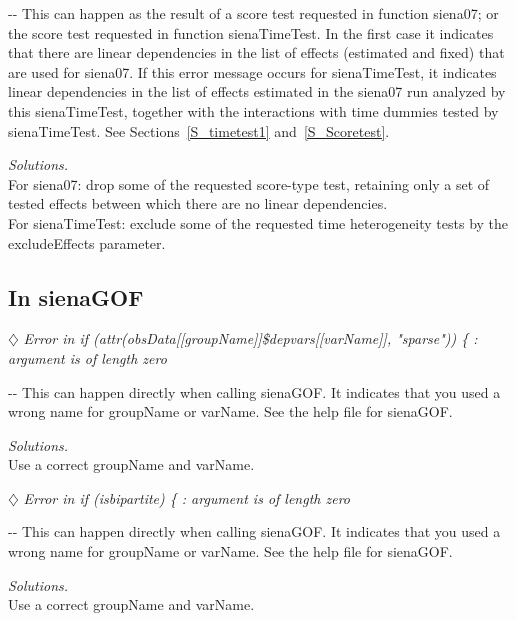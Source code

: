 \documentclass[a4paper,fleqn,11pt]{article}
\makeatletter
\newcommand{\+}{\, + \,}
\newcommand{\sfn}[1]{\textsf{#1}}
\newenvironment{indentation}[2]
{\par \setlength{\leftmargin}{#1}       \setlength{\rightmargin}{#2}
  \advance\linewidth -\leftmargin       \advance\linewidth -\rightmargin
  \advance\@totalleftmargin\leftmargin  \@setpar{{\@@par}}%
  \parshape 1 \@totalleftmargin         \linewidth \ignorespaces}{\par}
\makeatother
\begin{document}
\begin{indentation}{0.04\textwidth}{0pt}
\noindent
This can happen as the result of a score test requested in function
\sfn{siena07}; or the score test requested in function
\sfn{sienaTimeTest}.
In the first case it indicates that there are linear dependencies in the
list of effects (estimated and fixed)
that are used for \sfn{siena07}.
If this error message occurs for \sfn{sienaTimeTest}, it indicates
linear dependencies in the list of effects estimated
in the \sfn{siena07} run analyzed by this \sfn{sienaTimeTest},
together with the interactions with time dummies tested by
\sfn{sienaTimeTest}.
See Sections~\ref{S_timetest1} and~\ref{S_Scoretest}.
\smallskip

\noindent
\emph{Solutions.} \\
For \sfn{siena07}: drop some of the requested score-type test,
retaining only a set of tested effects between which there are no
linear dependencies.\\
For \sfn{sienaTimeTest}: exclude some of the requested
time heterogeneity tests by the \sfn{excludeEffects} parameter.
\end{indentation}

\subsection{In sienaGOF}

$\diamondsuit$
\emph{Error in if (attr(obsData[[groupName]]\$depvars[[varName]], "sparse")) \{ :\\
  argument is of length zero }
\smallskip

\begin{indentation}{0.04\textwidth}{0pt}
\noindent
This can happen directly when calling \sfn{sienaGOF}.
It indicates that you used a wrong name for \sfn{groupName} or \sfn{varName}.
See the help file for \sfn{sienaGOF}.
\smallskip

\noindent
\emph{Solutions.} \\
Use a correct \sfn{groupName} and \sfn{varName}.
\end{indentation}
\bigskip

\noindent
$\diamondsuit$
\emph{Error in if (isbipartite) \{ : argument is of length zero }
\smallskip

\begin{indentation}{0.04\textwidth}{0pt}
\noindent
This can happen directly when calling \sfn{sienaGOF}.
It indicates that you used a wrong name for \sfn{groupName} or \sfn{varName}.
See the help file for \sfn{sienaGOF}.
\smallskip

\noindent
\emph{Solutions.} \\
Use a correct \sfn{groupName} and \sfn{varName}.
\end{indentation}
\end{document}
